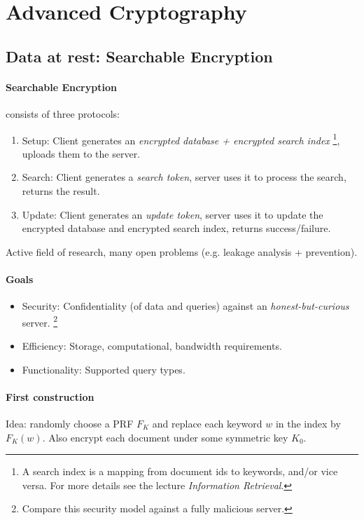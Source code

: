 
\section{Advanced Cryptography}

\subsection{Data at rest: Searchable Encryption}

\paragraph{Searchable Encryption}
consists of three protocols:
\begin{enumerate}
\item Setup:
Client generates an \emph{encrypted database + encrypted search index}%
\footnote{A search index is a mapping from document ids to keywords, and/or vice versa.
For more details see the lecture \textit{Information Retrieval}.},
uploads them to the server.
\item Search:
Client generates a \emph{search token}, server uses it to process the search, returns the result.
\item Update:
Client generates an \emph{update token}, server uses it to update the encrypted database and encrypted search index, returns success/failure.
\end{enumerate}
%
Active field of research, many open problems (e.g. leakage analysis + prevention).

\paragraph{Goals}
\begin{itemize}
\item Security:
Confidentiality (of data and queries) against an \emph{honest-but-curious} server.%
\footnote{Compare this security model against a fully malicious server.}
\item Efficiency:
Storage, computational, bandwidth requirements.
\item Functionality:
Supported query types.
\end{itemize}

\paragraph{First construction}
Idea: randomly choose a PRF $F_K$ and replace each keyword $w$ in the index by $F_K(w)$.
Also encrypt each document under some symmetric key $K_0$.

